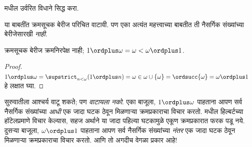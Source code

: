 \documentclass[../../../include/open-logic-section]{subfiles}
\begin{document}
\begin{prob}
 मधील उर्वरित विधाने सिद्ध करा.
\end{prob}

या बाबतींत क्रमसूचक बेरीज परिचित वाटावी. पण एका अत्यंत महत्त्वाच्या बाबतीत ती नैसर्गिक संख्यांच्या बेरीजेसारखी \emph{नाही}.

\begin{prop}
क्रमसूचक बेरीज {क्रमनिरपेक्ष नाही}; $1 \ordplus  \omega = \omega <
\omega \ordplus  1$.
\end{prop}

\begin{proof}
$1 \ordplus  \omega = \supstrict_{n < \omega} (1 \ordplus n)
= \omega \in \omega \cup \{\omega\} = \ordsucc{\omega} = \omega
\ordplus  1$ हे लक्षात घ्या.
\end{proof}
\noindent
सुरुवातीला आश्चर्य वाटू शकते; पण \emph{वाटायला नको}. एका बाजूला, $1 \ordplus  \omega$ पाहताना आपण सर्व नैसर्गिक संख्यांच्या \emph{आधी} एक जादा घटक ठेवून मिळणाऱ्या क्रमप्रकाराचा विचार करतो.  मधील हिल्बर्टच्या हॉटेलप्रमाणे विचार केल्यास, सहज अर्थाने या जादा पहिल्या घटकामुळे एकूण क्रमप्रकारात फरक पडू नये. दुसऱ्या बाजूला, $\omega \ordplus  1$ पाहताना आपण सर्व नैसर्गिक संख्यांच्या \emph{नंतर} एक जादा घटक ठेवून मिळणाऱ्या क्रमप्रकाराचा विचार करतो. आणि तो अगदीच वेगळा प्रकार आहे!
\end{document}
